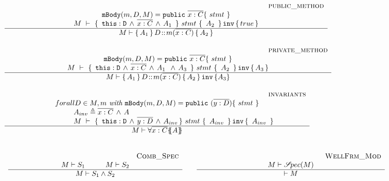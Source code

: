 {{$
\begin{array}{l}
\inferruleSD 
{~ \strut \hspace{6.5cm} {\sc{public\_method}}}
{  
 \prg{mBody}(m,D,M)=\prg{public} \ \overline{x:C}\{\  stmt \ \}      
    \\
  {\hprovesN{M} { \ \prg{this}:\prg{D}\, \wedge\, \overline{x:C}\, \wedge\, A_1\  } {\ stmt\ } {\ A_2 \ }   {true} } 
}
{
M \vdash {\mprepost {A_1}{D}{m}{x}{C}{A_2} }
}
\\ \\
\inferruleSD 
{~ \strut \hspace{6.5cm} {\sc{private\_method}}}
{  
  \prg{mBody}(m,D,M)=\prg{public} \ \overline{x:C}\{\  stmt \ \}      
    \\
  {\hprovesN{M} { \ \prg{this}:\prg{D}\, \wedge\, \overline{x:C}\, \wedge\, A_1\ \, \wedge\, A_3 \ } {\ stmt\ } {\ A_2 \ }   {A_3} } 
}
{
M \vdash {\mprepostN {A_1}{D}{m}{x}{C}{A_2} {A_3} }
}
\\
\\
\inferruleSD 
{~ \strut \hspace{6.5cm} {\sc{invariants}}}
{  
for all  D\in M,  m   \textit{ with } \prg{mBody}(m,D,M)=\prg{public} \ (\overline{y:D})\{\  stmt \ \}      
    \\
    \begin{array}{l}
  ~ \strut \hspace{1.5cm} A_{inv} \triangleq \overline{x:C}\, \wedge\, A
  \\
  ~ \strut \hspace{1.5cm}  {\hprovesN{M} { \ \prg{this}:\prg{D}\, \wedge\, \overline{y:D}\, \wedge\,  A_{inv} } {\ stmt\ } {\ A_{inv}\ } {\ A_{inv} \ }  }
\end{array}
}
{
M \vdash \TwoStatesN{ \overline{x:C}} {A}
}
\\
\\
\\
\begin{array}{lcl}
\inferruleSD 
{~ \strut   {\sc{Comb\_Spec}}}
{  
M \vdash S_1 \hspace{1cm}  M \vdash S_2
}
{
M \vdash S_1 \wedge S_2
}
& &
\inferruleSD 
{~ \strut  {\sc{WellFrm\_Mod}}}
{  M \vdash \SpecOf {M}
}
{
\vdash M  
}
\end{array}
\end{array}
$
 
}}
